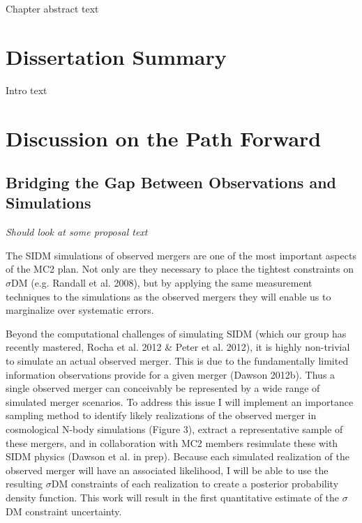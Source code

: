 \label{chapter:5}

Chapter abstract text

\section{Dissertation Summary}

Intro text

\section{Discussion on the Path Forward}

\subsection{Bridging the Gap Between Observations and Simulations}

\textit{Should look at some proposal text}

The SIDM simulations of observed mergers are one of the most important aspects of the MC2 plan.  Not only are they necessary to place the tightest constraints on $\sigma$DM  (e.g. Randall et al. 2008), but by applying the same measurement techniques to the simulations as the observed mergers they will enable us to marginalize over systematic errors.  

Beyond the computational challenges of simulating SIDM (which our group has recently mastered, Rocha et al. 2012 \& Peter et al. 2012), it is highly non-trivial to simulate an actual observed merger. This is due to the fundamentally limited information observations provide for a given merger (Dawson 2012b). Thus a single observed merger can conceivably be represented by a wide range of simulated merger scenarios. To address this issue I will implement an importance sampling method to identify likely realizations of the observed merger in cosmological N-body simulations (Figure 3), extract a representative sample of these mergers, and in collaboration with MC2 members resimulate these with SIDM physics (Dawson et al. in prep).  Because each simulated realization of the observed merger will have an associated likelihood, I will be able to use the resulting $\sigma$DM  constraints of each realization to create a posterior probability density function.  This work will result in the first quantitative estimate of the $\sigma$DM  constraint uncertainty. 

